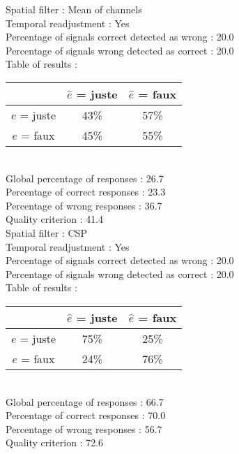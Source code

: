 Spatial filter : Mean of channels \\
Temporal readjustment : Yes \\
Percentage of signals correct detected as wrong :   20.0 \\
Percentage of signals wrong detected as correct :   20.0 \\
Table of results : \\
\begin{tabular}{|c|c|c|}
\hline				& $\hat{e}$ = juste & $\hat{e}$ = faux \\
\hline  $e$ = juste	&     43\%			&     57\%		\\
\hline  $e$ = faux	&     45\%			&     55\%		\\
\hline
\end{tabular}\\
Global percentage of responses :   26.7 \\
Percentage of correct responses :   23.3 \\
Percentage of wrong responses :   36.7 \\
Quality criterion :   41.4 \\

Spatial filter : CSP \\
Temporal readjustment : Yes \\
Percentage of signals correct detected as wrong :   20.0 \\
Percentage of signals wrong detected as correct :   20.0 \\
Table of results : \\
\begin{tabular}{|c|c|c|}
\hline				& $\hat{e}$ = juste & $\hat{e}$ = faux \\
\hline  $e$ = juste	&     75\%			&     25\%		\\
\hline  $e$ = faux	&     24\%			&     76\%		\\
\hline
\end{tabular}\\
Global percentage of responses :   66.7 \\
Percentage of correct responses :   70.0 \\
Percentage of wrong responses :   56.7 \\
Quality criterion :   72.6 \\

